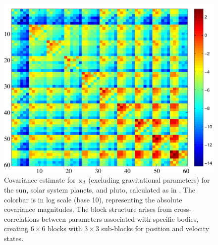 \begin{figure}[ht]
\centering
\includegraphics[width=5.5in]{./figures/covarianceEstimate}
 \caption[Solar system dynamic state covariance estimate]{Covariance estimate for $\mathbf x_d$ (excluding gravitational parameters) for the sun, solar system planets, and pluto, calculated as in .  The colorbar is in log scale (base 10), representing the absolute covariance magnitudes.  The block structure arises from cross-correlations between parameters associated with specific bodies, creating $6 \times 6$ blocks with $3 \times 3$ sub-blocks for position and velocity states. \label{fig:covarianceEstimate}}
\end{figure} 

